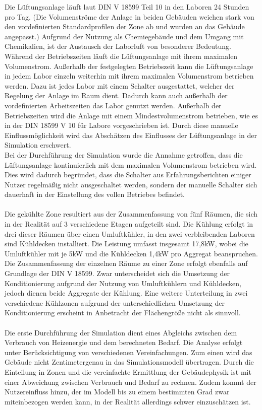 Die Lüftungsanlage läuft laut DIN V 18599 Teil 10 in den Laboren 24 Stunden pro Tag. (Die Volumenströme der Anlage in beiden Gebäuden weichen stark von den vordefinierten Standardprofilen der Zone ab und wurden an das Gebäude angepasst.) Aufgrund der Nutzung als Chemiegebäude und dem Umgang mit Chemikalien, ist der Austausch der Laborluft von besonderer Bedeutung. Während der Betriebszeiten läuft die Lüftungsanlage mit ihrem maximalen Volumenstrom. Außerhalb der festgelegten Betriebszeit kann die Lüftungsanlage in jedem Labor einzeln weiterhin mit ihrem maximalen Volumenstrom betrieben werden. Dazu ist jedes Labor mit einem Schalter ausgestattet, welcher der Regelung der Anlage im Raum dient. Dadurch kann auch außerhalb der vordefinierten Arbeitszeiten das Labor genutzt werden. Außerhalb der Betriebszeiten wird die Anlage mit einem Mindestvolumenstrom betrieben, wie es in der DIN 18599 V 10 für Labore vorgeschrieben ist. Durch diese manuelle Einflussmöglichkeit wird das Abschätzen des Einflusses der Lüftungsanlage in der Simulation erschwert.  \\
Bei der Durchführung der Simulation wurde die Annahme getroffen, dass die Lüftungsanlage kontinuierlich mit dem maximalen Volumenstrom betrieben wird. Dies wird dadurch begründet, dass die Schalter aus Erfahrungsberichten einiger Nutzer regelmäßig nicht ausgeschaltet werden, sondern der manuelle Schalter sich dauerhaft in der Einstellung des vollen Betriebes befindet. \\
\\
Die gekühlte Zone resultiert aus der Zusammenfassung von fünf Räumen, die sich in der Realität auf 3 verschiedene Etagen aufgeteilt sind. Die Kühlung erfolgt in drei dieser Räumen über einen Umluftkühler, in den zwei verbleibenden Laboren sind Kühldecken installiert. Die Leistung umfasst insgesamt 17,8kW, wobei die Umluftkühler mit je 5kW und die Kühldecken 1,4kW pro Aggregat beanspruchen. Die Zusammenfassung der einzelnen Räume zu einer Zone erfolgt ebenfalls auf Grundlage der DIN V 18599. 
Zwar unterscheidet sich die Umsetzung der Konditionierung aufgrund der Nutzung von Umluftkühlern und Kühldecken, jedoch dienen beide Aggregate der Kühlung. Eine weitere Unterteilung in zwei verschiedene Kühlzonen aufgrund der unterschiedlichen Umsetzung der Konditionierung erscheint in Anbetracht der Flächengröße nicht als sinnvoll.\\
\\
Die erste Durchführung der Simulation dient eines Abgleichs zwischen dem Verbrauch von Heizenergie und dem berechneten Bedarf. Die Analyse erfolgt unter Berücksichtigung von verschiedenen Vereinfachungen. Zum einen wird das Gebäude nicht Zentimetergenau in das Simulationsmodell übertragen. Durch die Einteilung in Zonen und die vereinfachte Ermittlung der Gebäudephysik ist mit einer Abweichung zwischen Verbrauch und Bedarf zu rechnen. Zudem kommt der Nutzereinfluss hinzu, der im Modell bis zu einem bestimmten Grad zwar miteinbezogen werden kann, in der Realität allerdings schwer einzuschätzen ist. 
